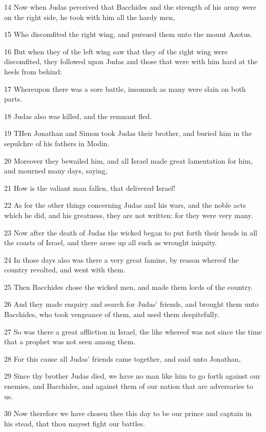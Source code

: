 \par 14 Now when Judas perceived that Bacchides and the strength of his army were on the right side, he took with him all the hardy men,
\par 15 Who discomfited the right wing, and pursued them unto the mount Azotus.
\par 16 But when they of the left wing saw that they of the right wing were discomfited, they followed upon Judas and those that were with him hard at the heels from behind:
\par 17 Whereupon there was a sore battle, insomuch as many were slain on both parts.
\par 18 Judas also was killed, and the remnant fled.
\par 19 THen Jonathan and Simon took Judas their brother, and buried him in the sepulchre of his fathers in Modin.
\par 20 Moreover they bewailed him, and all Israel made great lamentation for him, and mourned many days, saying,
\par 21 How is the valiant man fallen, that delivered Israel!
\par 22 As for the other things concerning Judas and his wars, and the noble acts which he did, and his greatness, they are not written: for they were very many.
\par 23 Now after the death of Judas the wicked began to put forth their heads in all the coasts of Israel, and there arose up all such as wrought iniquity.
\par 24 In those days also was there a very great famine, by reason whereof the country revolted, and went with them.
\par 25 Then Bacchides chose the wicked men, and made them lords of the country.
\par 26 And they made enquiry and search for Judas' friends, and brought them unto Bacchides, who took vengeance of them, and used them despitefully.
\par 27 So was there a great affliction in Israel, the like whereof was not since the time that a prophet was not seen among them.
\par 28 For this cause all Judas' friends came together, and said unto Jonathan,
\par 29 Since thy brother Judas died, we have no man like him to go forth against our enemies, and Bacchides, and against them of our nation that are adversaries to us.
\par 30 Now therefore we have chosen thee this day to be our prince and captain in his stead, that thou mayest fight our battles.
